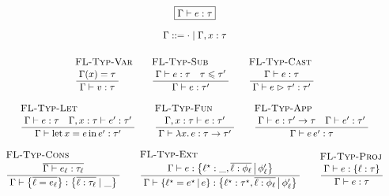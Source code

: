 $$ 
\begin{array}{c}
\boxed{\Gamma \vdash e : \tau} 
\\[0.5em]
\Gamma ::= \cdot \mid \Gamma, x : \tau
\\[1em]
\irule{FL-Typ-Var}{\Gamma(x) = \tau}{\Gamma \vdash v : \tau}
\quad 
\irule{FL-Typ-Sub}{\Gamma \vdash e : \tau \quad \tau \sub \tau'}{\Gamma \vdash e : \tau'}
\quad
\irule{FL-Typ-Cast}{\Gamma \vdash e : \tau}{\Gamma \vdash \flcast e \tau' : \tau'}
\\[2em]
\irule{FL-Typ-Let}{\Gamma \vdash e : \tau \quad \Gamma, x : \tau \vdash e' : \tau'}{\Gamma \vdash \fllet{x}{e}{e'} : \tau'}
\quad 
\irule{FL-Typ-Fun}{\Gamma, x : \tau \vdash e : \tau'}{\Gamma \vdash \fllam{x} e : \tau \to \tau'}    
\quad 
\irule{FL-Typ-App}{\Gamma \vdash e : \tau' \to \tau \quad \Gamma \vdash e' : \tau'}{\Gamma \vdash e\,e' : \tau}
\\[2em]
\irule{FL-Typ-Cons}
    {\overline{\Gamma \vdash e_\ell : \tau_\ell}}
    {\Gamma \vdash \flrec{\overline{\ell = e_\ell}} : \flrec{\overline{\ell : \tau_\ell} \mid \flabsent}}
\quad
\irule{FL-Typ-Ext}
    {\Gamma \vdash e : \flext{\ell^\star : \flabsent, \overline{\ell : \phi_\ell}}{\phi_\ell'}}
    {\Gamma \vdash \flext{\ell^\star = e^\star}{e} : \flext{\ell^\star : \tau^\star, \overline{\ell : \phi_\ell}}{\phi_\ell'}}
\quad
\irule{FL-Typ-Proj}
    {\Gamma \vdash e : \flrec{ \ell : \tau }}
    {\Gamma \vdash e : \tau}
\end{array} 
$$